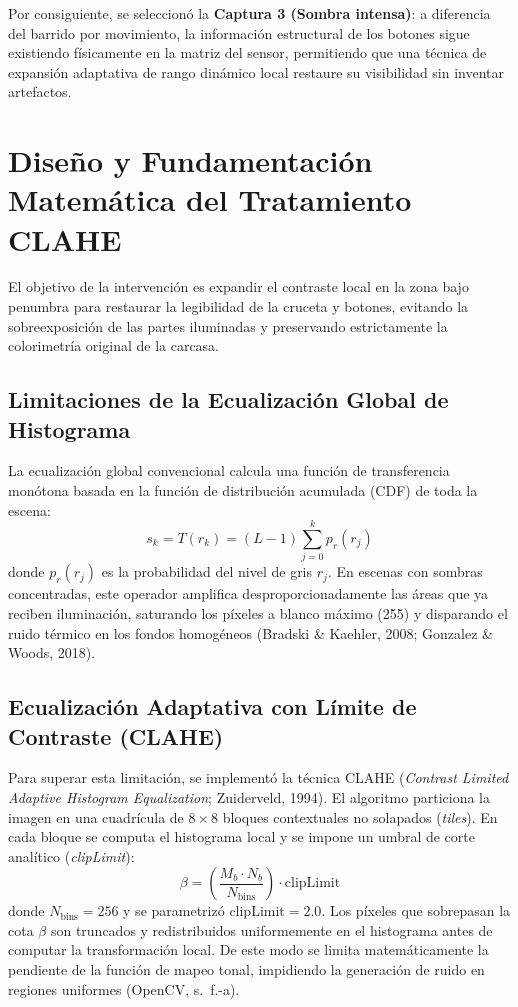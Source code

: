 \documentclass[12pt,letterpaper]{article}
\begin{document}
Por consiguiente, se seleccion\'o la \textbf{Captura 3 (Sombra intensa)}: a diferencia del barrido por movimiento, la informaci\'on estructural de los botones sigue existiendo f\'isicamente en la matriz del sensor, permitiendo que una t\'ecnica de expansi\'on adaptativa de rango din\'amico local restaure su visibilidad sin inventar artefactos.

\section{Dise\~no y Fundamentaci\'on Matem\'atica del Tratamiento CLAHE}
El objetivo de la intervenci\'on es expandir el contraste local en la zona bajo penumbra para restaurar la legibilidad de la cruceta y botones, evitando la sobreexposici\'on de las partes iluminadas y preservando estrictamente la colorimetr\'ia original de la carcasa.

\subsection{Limitaciones de la Ecualizaci\'on Global de Histograma}
La ecualizaci\'on global convencional calcula una funci\'on de transferencia mon\'otona basada en la funci\'on de distribuci\'on acumulada (CDF) de toda la escena:
\begin{equation}
    s_k = T(r_k) = (L-1) \sum_{j=0}^k p_r(r_j)
\end{equation}
donde $p_r(r_j)$ es la probabilidad del nivel de gris $r_j$. En escenas con sombras concentradas, este operador amplifica desproporcionadamente las \'areas que ya reciben iluminaci\'on, saturando los p\'ixeles a blanco m\'aximo (255) y disparando el ruido t\'ermico en los fondos homog\'eneos (Bradski \& Kaehler, 2008; Gonzalez \& Woods, 2018).

\subsection{Ecualizaci\'on Adaptativa con L\'imite de Contraste (CLAHE)}
Para superar esta limitaci\'on, se implement\'o la t\'ecnica CLAHE (\textit{Contrast Limited Adaptive Histogram Equalization}; Zuiderveld, 1994). El algoritmo particiona la imagen en una cuadr\'icula de $8 \times 8$ bloques contextuales no solapados (\textit{tiles}). En cada bloque se computa el histograma local y se impone un umbral de corte anal\'itico (\textit{clipLimit}):
\begin{equation}
    \beta = \left(\frac{M_b \cdot N_b}{N_{\text{bins}}}\right) \cdot \text{clipLimit}
\end{equation}
donde $N_{\text{bins}} = 256$ y se parametriz\'o $\text{clipLimit} = 2.0$. Los p\'ixeles que sobrepasan la cota $\beta$ son truncados y redistribuidos uniformemente en el histograma antes de computar la transformaci\'on local. De este modo se limita matem\'aticamente la pendiente de la funci\'on de mapeo tonal, impidiendo la generaci\'on de ruido en regiones uniformes (OpenCV, s.~f.-a).
\end{document}
